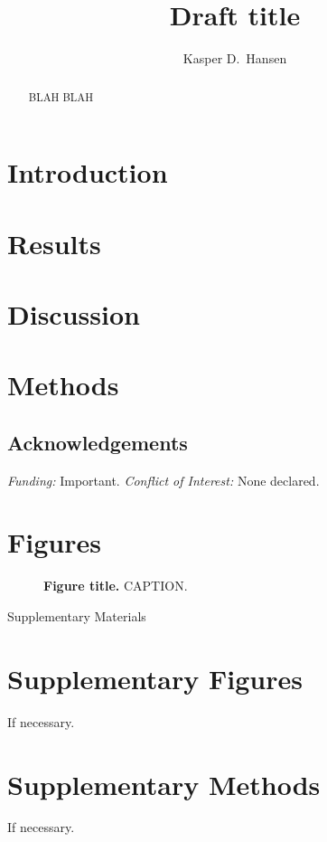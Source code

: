 \documentclass[pdftex,english,12pt]{article}
\begin{document}
\title{Draft title}

\author[1,2,*]{Kasper D.\ Hansen}

\date{}
\maketitle

\begin{abstract}
  \noindent 
  BLAH BLAH
\end{abstract}

\clearpage

\section*{Introduction}

\section*{Results}

\section*{Discussion}

\section*{Methods}

\subsection*{Acknowledgements}

\emph{Funding:} Important.
\emph{Conflict of Interest:} None declared.

\clearpage

\printbibliography[title=Bibliography]

\clearpage

\section*{Figures}

\begin{figure}[h!]
  \centering
  \caption{\textbf{Figure title.}  CAPTION.}
  \label{fig:example}
\end{figure}


{\huge Supplementary Materials}

\renewcommand{\figurename}{Supplementary Figure}
\setcounter{figure}{0}
\makeatletter
\renewcommand{\thefigure}{S\@arabic\c@figure}
\makeatother

\section*{Supplementary Figures}

If necessary.  

\section*{Supplementary Methods}

If necessary.
\end{document}
